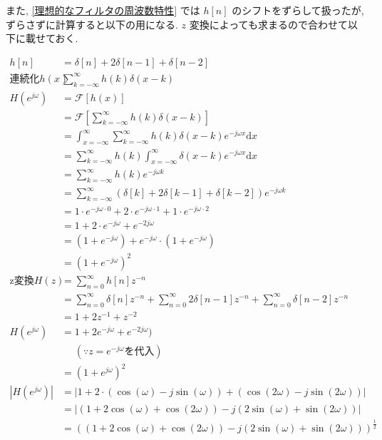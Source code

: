 \documentclass[12pt]{jsarticle}
\begin{document}
        また, \ref{理想的なフィルタの周波数特性} では $h[n]$ のシフトをずらして扱ったが,ずらさずに計算すると以下の用になる.
        $z$ 変換によっても求まるので合わせて以下に載せておく.
        
        \begin{align*}
          h [n] &= \delta [n] + 2 \delta [n-1] + \delta [n-2] \\
          \text{連続化} h(x) & \sum_{k=- \infty}^{\infty} h(k) \delta(x-k)\\
          H(e^{j \omega})
            &= \mathscr{F} \left[ h(x) \right] \\
            &= \mathscr{F} \left[ \sum_{k=- \infty}^{\infty} h(k) \delta(x-k) \right] \\
            &= \int_{x=-\infty}^{\infty} \sum_{k=- \infty}^{\infty} h(k) \delta(x-k) e^{-j \omega x} \mathrm{d} x \\
            &= \sum_{k=- \infty}^{\infty} h(k) \int_{x=-\infty}^{\infty} \delta(x-k) e^{-j \omega x} \mathrm{d} x \\
            &= \sum_{k=- \infty}^{\infty} h(k) e^{-j \omega k} \\
            &= \sum_{k=- \infty}^{\infty} \left( \delta [k] + 2 \delta [k-1] + \delta [k-2] \right) e^{-j \omega k} \\
            &= 1 \cdot e^{-j \omega \cdot 0} + 2 \cdot e^{-j \omega \cdot 1} + 1 \cdot e^{-j \omega \cdot 2} \\
            &= 1 + 2 \cdot e^{-j \omega} + e^{-2j \omega} \\
            &= (1 + e^{-j \omega}) + e^{-j \omega} \cdot (1 + e^{-j \omega}) \\
            &= (1 + e^{-j \omega})^2 \\
          \text{z変換} H(z)
            &= \sum_{n=0}^{\infty} h[n] z^{-n} \\
            &= \sum_{n=0}^{\infty} \delta[n] z^{-n}
              + \sum_{n=0}^{\infty} 2 \delta[n-1] z^{-n}
              + \sum_{n=0}^{\infty} \delta[n-2] z^{-n} \\
            &= 1 + 2z^{-1} + z^{-2} \\
          H(e^{j \omega})
            &= 1 + 2 e^{-j \omega} + e^{-2j \omega}) \\
            & \ \ \ \ \ \  (\because z=e^{-j \omega} \text{を代入}) \\
            &= (1 + e^{j \omega})^2 \\
          | H(e^{j \omega}) |
            &= | 1 + 2 \cdot (\cos(\omega) - j \sin(\omega))  + (\cos(2\omega) - j\sin(2\omega)) | \\
            &= | (1 + 2 \cos(\omega) + \cos(2\omega)) - j ( 2\sin(\omega) + \sin(2\omega)) | \\
            &= ( (1 + 2 \cos(\omega) + \cos(2\omega)) - j ( 2\sin(\omega) + \sin(2\omega)) )^{\frac{1}{2}} \\
        \end{align*}
        
\end{document}
